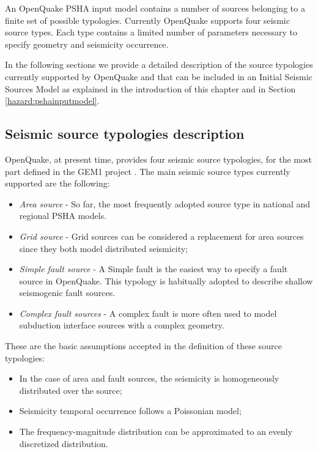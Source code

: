 An OpenQuake PSHA input model contains a number of sources belonging 
to a finite set of possible typologies. Currently OpenQuake supports 
four seismic source types. Each type contains a limited number of 
parameters necessary to specify geometry and seismicity occurrence. 

In the following sections we provide a detailed description of the 
source typologies currently supported by OpenQuake and that can be 
included in an Initial Seismic Sources Model as explained in the 
introduction of this chapter and in Section \ref{hazard:pshainputmodel}.
%
\subsection{Seismic source typologies description}
%
OpenQuake, at present time, provides four seismic source typologies, 
for the most part defined in the GEM1 project \citep{pagani2010}. 
%
The main seismic source types currently supported are the following:
\begin{itemize}
\item \emph{Area source} - So far, the most frequently adopted source 
type in national and regional PSHA models.
\item \emph{Grid source} - Grid sources can be considered a replacement 
for area sources since they both model distributed seismicity;
\item \emph{Simple fault source} - A Simple fault is the easiest way to
specify a fault source in OpenQuake. This typology is habitually adopted 
to describe shallow seismogenic fault sources.
\item \emph{Complex fault sources} - A complex fault is more often used 
to model subduction interface sources with a complex geometry. 
\end{itemize}

These are the basic assumptions accepted in the definition of these source 
typologies:
\begin{itemize}
\item In the case of area and fault sources, the seismicity is homogeneously 
distributed over the source; 
\item Seismicity temporal occurrence follows a Poissonian model; 
\item The frequency-magnitude distribution can be approximated to an evenly 
discretized distribution. 
\end{itemize}
%
